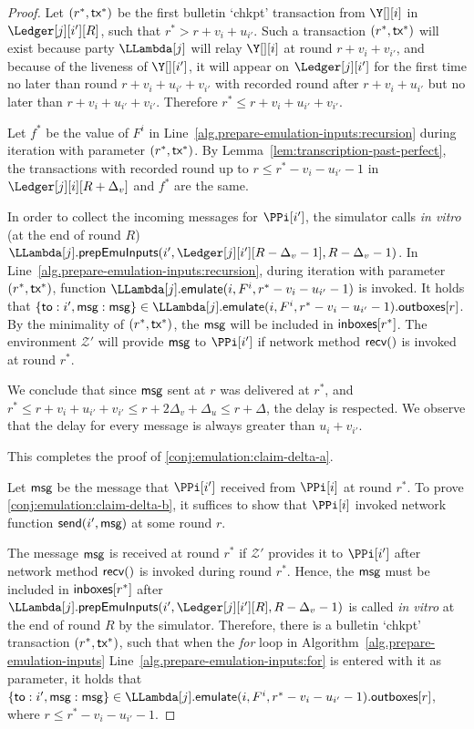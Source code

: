 \begin{proof}
  Let $(r^*, \textsf{tx}^*)$ be the first bulletin `chkpt' transaction from $\Y[][i]$ in $\Ledger[j][i'][R]$, such that
  $r^* > r + v_{i} + u_{i'}$.
  Such a transaction $(r^*, \textsf{tx}^*)$ will exist because party $\LLambda[j]$ will relay $\Y[][i]$
  at round $r + v_i + v_{i'}$, and
  because of the liveness of $\Y[][i']$, it will appear on $\Ledger[j][i']$ for the
  first time no later than round $r + v_i + u_{i'} + v_{i'}$ with recorded round
  after $r + v_i + u_{i'}$ but no later than $r + v_i + u_{i'} + v_{i'}$.
  Therefore $r^* \leq r + v_{i} + u_{i'} + v_{i'}$.

  Let $f^*$ be the value of $F^i$ in Line~\ref{alg.prepare-emulation-inputs:recursion}
  during iteration with parameter $(r^*, \textsf{tx}^*)$.
  By Lemma~\ref{lem:transcription-past-perfect}, the transactions with
  recorded round up to $r \leq r^* - v_i - u_{i'} - 1$ in $\Ledger[j][i][R + \Delta_v]$
  and $f^*$ are the same.

  In order to collect the incoming messages for $\PPi[i']$,
  the simulator calls \emph{in vitro} (at the end of round $R$)
  $\LLambda[j].\prepareEmulationInputs(i', \Ledger[j][i'][R - \Delta_v - 1], \allowbreak R - \Delta_v - 1)$.
  In Line~\ref{alg.prepare-emulation-inputs:recursion}, during iteration with parameter
  $(r^*, \textsf{tx}^*)$, function $\LLambda[j].\emulate(i, F^i, r^* - v_i - u_{i'} - 1)$ is invoked. It holds that
  $\{\textsf{to}: i', \msg: \msg\} \in \LLambda[j].\emulate(i, F^i, r^* - v_i - u_{i'} - 1).\outboxes[r]$.
  By the minimality of $(r^*, \textsf{tx}^*)$, the $\textsf{msg}$ will be included in $\textsf{inboxes}[r^*]$.
  The environment $\mathcal{Z}'$ will provide $\textsf{msg}$ to $\PPi[i']$
  if network method $\textsf{recv}()$ is invoked at round $r^*$.

  We conclude that since $\textsf{msg}$ sent at $r$ was delivered at $r^*$,
  and $r^* \leq r + v_{i} + u_{i'} + v_{i'} \leq r + 2 \Delta_v + \Delta_u \leq r + \Delta$, the
  delay is respected. We observe that the delay for every message is always
  greater than $u_i + v_{i'}$.

  This completes the proof of \ref{conj:emulation:claim-delta-a}.

  Let $\textsf{msg}$ be the message that $\PPi[i']$ received from $\PPi[i]$ at round $r^*$.
  To prove \ref{conj:emulation:claim-delta-b}, it suffices to show that
  $\PPi[i]$ invoked network function $\textsf{send}(i', \textsf{msg})$ at some round $r$.

  The message $\textsf{msg}$ is received at round $r^*$ if $\mathcal{Z}'$ provides
  it to $\PPi[i']$ after network method $\textsf{recv}()$ is invoked during round $r^*$.
  Hence, the $\textsf{msg}$ must be included in $\textsf{inboxes}[r^*]$ after $\LLambda[j].\prepareEmulationInputs(\allowbreak i', \Ledger[j][i'][R], R - \Delta_v - 1)$
  is called \emph{in vitro} at the end of round $R$ by the simulator.
  Therefore, there is a bulletin `chkpt' transaction $(r^*, \textsf{tx}^*)$, such that
  when the \emph{for} loop in Algorithm~\ref{alg.prepare-emulation-inputs} Line~\ref{alg.prepare-emulation-inputs:for}
  is entered with it as parameter, it holds that
  $\{\textsf{to}: i', \msg: \msg\} \in \LLambda[j].\emulate(i, F^i, \allowbreak r^* - v_i - u_{i'} - 1).\outboxes[r]$,
  where $r \leq r^* - v_i - u_{i'} - 1$.


\end{proof}
